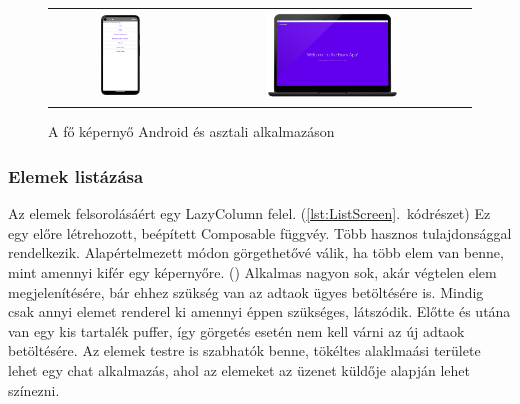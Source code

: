 \begin{figure}[!ht]
    \centering
    \begin{tabular}{cc}
        \includegraphics[width=0.3\textwidth, keepaspectratio]{figures/MainScreen_Android.png} & 
        \includegraphics[width=0.5\textwidth, keepaspectratio]{figures/MainScreen_Desktop1_framed.png}
    \end{tabular}
    \caption{A fő képernyő Android és asztali alkalmazáson}
    \label{fig:MainScreen}
\end{figure}


\pagebreak

\subsubsection{Elemek listázása}

Az elemek felsorolásáért egy LazyColumn felel. (\ref{lst:ListScreen}.~kódrészet)
Ez egy előre létrehozott, beépített Composable függvéy.
Több hasznos tulajdonsággal rendelkezik. Alapértelmezett módon görgethetővé válik, ha több elem van benne, mint amennyi kifér egy képernyőre. ()
Alkalmas nagyon sok, akár végtelen elem megjelenítésére, bár ehhez szükség van az adtaok ügyes betöltésére is. 
Mindig csak annyi elemet renderel ki amennyi éppen szükséges, látszódik. Előtte és utána van egy kis tartalék puffer, így görgetés esetén nem kell várni az új adtaok betöltésére.
Az elemek testre is szabhatók benne, tökéltes alaklmaási területe lehet egy chat alkalmazás, ahol az elemeket az üzenet küldője alapján lehet színezni.

